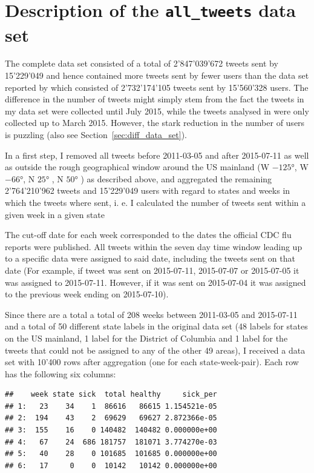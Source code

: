 \documentclass[11pt, a4paper,twoside]{report}\usepackage[]{graphicx}\usepackage[]{color}
\makeatletter
\newenvironment{kframe}{%
 \def\at@end@of@kframe{}%
 \ifinner\ifhmode%
  \def\at@end@of@kframe{\end{minipage}}%
  \begin{minipage}{\columnwidth}%
 \fi\fi%
 \def\FrameCommand##1{\hskip\@totalleftmargin \hskip-\fboxsep
 \colorbox{shadecolor}{##1}\hskip-\fboxsep
     \hskip-\linewidth \hskip-\@totalleftmargin \hskip\columnwidth}%
 \MakeFramed {\advance\hsize-\width
   \@totalleftmargin\z@ \linewidth\hsize
   \@setminipage}}%
 {\par\unskip\endMakeFramed%
 \at@end@of@kframe}
\newenvironment{knitrout}{}{} %
\makeatother
\begin{document}
\section{Description of the \texttt{all\_tweets} data set}
\label{sec:full_set}

The complete data set consisted of a total of 2'847'039'672 tweets sent by 15'229'049 and hence contained more tweets sent by fewer users than the data set reported by \cite{bodnar_data_2015} which consisted of 2'732'174'105 tweets sent by 15'560'328 users. The difference in the number of tweets might simply stem from the fact the tweets in my data set were collected until July 2015, while the tweets analysed in \cite{bodnar_data_2015} were only collected up to March 2015. However, the stark reduction in the number of users is puzzling (also see Section~\ref{sec:diff_data_set}).

In a first step, I removed all tweets before 2011-03-05 and after 2015-07-11 as well as outside the rough geographical window around the US mainland (W $-125$°, W $-66$°, N $25$° , N $50$° ) as described above, and aggregated the remaining 2'764'210'962 tweets and 15'229'049 users with regard to states and weeks in which the tweets where sent, i. e. I calculated the number of tweets sent within a given week in a given state

The cut-off date for each week corresponded to the dates the official CDC flu reports were published. All tweets within the seven day time window leading up to a specific data were assigned to said date, including the tweets sent on that date (For example, if tweet was sent on 2015-07-11, 2015-07-07 or 2015-07-05 it was assigned to 2015-07-11. However, if it was sent on 2015-07-04 it was assigned to the previous week ending on 2015-07-10).

Since there are a total a total of 208 weeks between 2011-03-05 and 2015-07-11 and a total of 50 different state labels in the original data set (48 labels for states on the US mainland, 1 label for the District of Columbia and 1 label for the tweets that could not be assigned to any of the other 49 areas), I received a data set with 10'400 rows after aggregation (one for each state-week-pair). Each row has the following six columns:

\begin{knitrout}
\color{fgcolor}\begin{kframe}
\begin{verbatim}
##    week state sick  total healthy     sick_per
## 1:   23    34    1  86616   86615 1.154521e-05
## 2:  194    43    2  69629   69627 2.872366e-05
## 3:  155    16    0 140482  140482 0.000000e+00
## 4:   67    24  686 181757  181071 3.774270e-03
## 5:   40    28    0 101685  101685 0.000000e+00
## 6:   17     0    0  10142   10142 0.000000e+00
\end{verbatim}
\end{kframe}
\end{knitrout}
\end{document}
